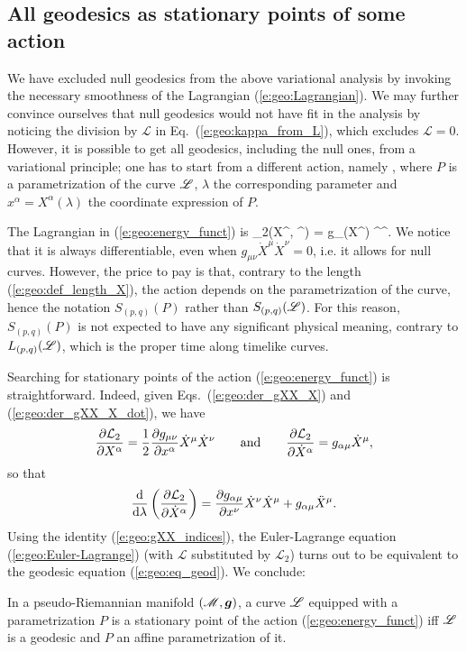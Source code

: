 \subsection{All geodesics as stationary points of some action} \label{s:geo:all_geod}

We have excluded null geodesics from the above variational analysis by
invoking the necessary smoothness of the Lagrangian (\ref{e:geo:Lagrangian}).
We may further convince ourselves that null geodesics would not have fit
in the analysis by noticing the division by $\mathcal{L}$ in Eq.~(\ref{e:geo:kappa_from_L}),
which excludes $\mathcal{L} = 0$.
However, it is possible to get all geodesics, including the null ones, from
a variational principle; one has to start from a different action, namely
\be \label{e:geo:energy_funct}
    ,
\ee
where $P$ is a parametrization of the curve $\mathscr{L}$, $\lambda$
the corresponding parameter
and $x^\alpha = X^\alpha(\lambda)$ the coordinate expression of $P$.

The Lagrangian in (\ref{e:geo:energy_funct}) is
\be \label{e:geo:Lagrangian2}
   _2(X^\alpha, ^\alpha) =  
        g_{\mu\nu}(X^\rho) ^\mu {}^\nu  .
\ee
We notice that it is always differentiable, even
when $g_{\mu\nu}\dot{X}^\mu \dot{X}^\nu  = 0$, i.e. it allows for null curves.
However, the price to pay is that,
contrary to the length (\ref{e:geo:def_length_X}),
the action depends on the parametrization of the curve,
hence the notation $S_{(p,q)}(P)$ rather than $S_{(p,q)}(\mathscr{L})$.
For this reason, $S_{(p,q)}(P)$ is not expected to have any significant
physical meaning, contrary to $L_{(p,q)}(\mathscr{L})$, which is the proper
time along timelike curves.

Searching for stationary points of the action
(\ref{e:geo:energy_funct}) is straightforward. Indeed,
given Eqs.~(\ref{e:geo:der_gXX_X}) and (\ref{e:geo:der_gXX_X_dot}),
we have
\[
    \frac{\partial \mathcal{L}_2}{\partial X^\alpha} = \frac{1}{2}
        \frac{\partial g_{\mu\nu}}{\partial x^\alpha}  \dot{X}^\mu \dot{X}^\nu
    \qquad\mbox{and}\qquad
    \frac{\partial \mathcal{L}_2}{\partial \dot{X}^\alpha} = g_{\alpha\mu} \dot{X}^\mu ,
\]
so that
\[
    \frac{\mathrm{d}}{\mathrm{d}\lambda}\left( \frac{\partial \mathcal{L}_2}{\partial \dot{X}^\alpha}\right) =
      \frac{\partial g_{\alpha\mu}}{\partial x^\nu} \dot{X}^\nu \dot{X}^\mu
      + g_{\alpha\mu} \ddot{X}^\mu .
\]
Using the identity (\ref{e:geo:gXX_indices}), the Euler-Lagrange equation
(\ref{e:geo:Euler-Lagrange}) (with $\mathcal{L}$ substituted by $\mathcal{L}_2$)
turns out to be equivalent to the geodesic equation (\ref{e:geo:eq_geod}).
We conclude:
\begin{prop}
In a pseudo-Riemannian manifold $(\mathscr{M},\bm{g})$, a
curve $\mathscr{L}$ equipped with a parametrization $P$
is a stationary point of the action (\ref{e:geo:energy_funct})
iff $\mathscr{L}$ is a geodesic and $P$ an affine parametrization of it.
\end{prop}

